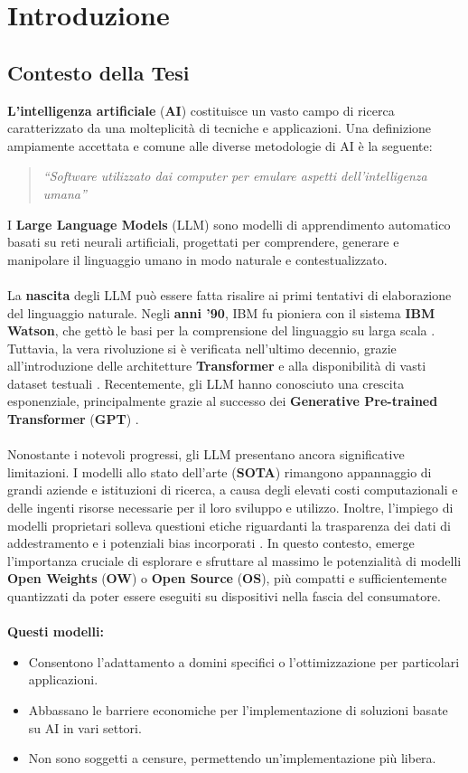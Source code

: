 \section{Introduzione}
\subsection{Contesto della Tesi}
\textbf{L'intelligenza artificiale} (\textbf{AI}) costituisce un vasto campo di ricerca caratterizzato da una molteplicità di tecniche e applicazioni.
Una definizione ampiamente accettata e comune alle diverse metodologie di AI è la seguente:
\begin{quote}
\textit{
``Software utilizzato dai computer per emulare aspetti dell'intelligenza umana'' \cite{russell2010}
}
\end{quote}
I \textbf{Large Language Models} (LLM) sono modelli di apprendimento automatico basati su reti neurali artificiali, progettati per comprendere, generare e manipolare il linguaggio umano in modo naturale e contestualizzato.\\\\
La \textbf{nascita} degli LLM può essere fatta risalire ai primi tentativi di elaborazione del linguaggio naturale.
Negli \textbf{anni '90}, IBM fu pioniera con il sistema \textbf{IBM Watson}, che gettò le basi per la comprensione del linguaggio su larga scala \cite{brown1993mathematics}. Tuttavia, la vera rivoluzione si è verificata nell'ultimo decennio, grazie all'introduzione delle architetture \textbf{Transformer} e alla disponibilità di vasti dataset testuali \cite{vaswani2017attention}. Recentemente, gli LLM hanno conosciuto una crescita esponenziale, principalmente grazie al successo dei \textbf{Generative Pre-trained Transformer} (\textbf{GPT}) \cite{vaswani2017attention}.\\\\
Nonostante i notevoli progressi, gli LLM presentano ancora significative limitazioni.
I modelli allo stato dell'arte (\textbf{SOTA}) rimangono appannaggio di grandi aziende e istituzioni di ricerca, a causa degli elevati costi computazionali e delle ingenti risorse necessarie per il loro sviluppo e utilizzo.
Inoltre, l'impiego di modelli proprietari solleva questioni etiche riguardanti la trasparenza dei dati di addestramento e i potenziali bias incorporati \cite{ntoutsi2020bias}.
In questo contesto, emerge l'importanza cruciale di esplorare e sfruttare al massimo le potenzialità di modelli \textbf{Open Weights} (\textbf{OW}) o \textbf{Open Source} (\textbf{OS}), più compatti e sufficientemente quantizzati da poter essere eseguiti su dispositivi nella fascia del consumatore.\\\\
\textbf{Questi modelli:}
\begin{itemize}
\item Consentono l'adattamento a domini specifici o l'ottimizzazione per particolari applicazioni.
\item Abbassano le barriere economiche per l'implementazione di soluzioni basate su AI in vari settori.
\item Non sono soggetti a censure, permettendo un'implementazione più libera.
\end{itemize}


